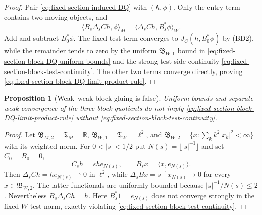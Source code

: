 \documentclass[11pt]{article}
\newtheorem{proposition}[theorem]{Proposition}
\begin{document}
\begin{proof}
Pair \eqref{eq:fixed-section-induced-DQ} with $(h,\phi)$.  Only the entry
term contains two moving objects, and
\[
 \langle B_s\Delta_sCh,\phi\rangle_M
 =\langle\Delta_sCh,B_s^*\phi\rangle_W.
\]
Add and subtract $B_0^*\phi$.  The fixed-test term converges to
$J_C(h,B_0^*\phi)$ by \textup{(BD2)}, while the remainder tends to zero by
the uniform $\mathfrak B_{W,1}$ bound in
\eqref{eq:fixed-section-block-DQ-uniform-bounds} and the strong test-side
continuity \eqref{eq:fixed-section-block-test-continuity}.  The other two
terms converge directly, proving
\eqref{eq:fixed-section-block-DQ-limit-product-rule}.
\end{proof}

\begin{proposition}[Weak--weak block gluing is false]
\label{prop:fixed-section-weak-block-countermodel}
Uniform bounds and separate weak convergence of the three block quotients do
not imply \eqref{eq:fixed-section-block-DQ-limit-product-rule} without
\eqref{eq:fixed-section-block-test-continuity}.
\end{proposition}

\begin{proof}
Let $\mathfrak B_{M,2}=\mathfrak T_M=\mathbb R$,
$\mathfrak B_{W,1}=\mathfrak T_W=\ell^2$, and
$\mathfrak B_{W,2}=\{x:\sum_k k^2|x_k|^2<\infty\}$ with its weighted norm.
For $0<|s|<1/2$ put $N(s)=\lfloor|s|^{-1}\rfloor$ and set
$C_0=B_0=0$,
\[
 C_sh=sh e_{N(s)},
 \qquad B_sx=\langle x,e_{N(s)}\rangle.
\]
Then $\Delta_sCh=he_{N(s)}\rightharpoonup0$ in $\ell^2$, while
$\Delta_sBx=s^{-1}x_{N(s)}\to0$ for every $x\in\mathfrak B_{W,2}$.
The latter functionals are uniformly bounded because
$|s|^{-1}/N(s)\le2$.  Nevertheless
$B_s\Delta_sCh=h$.  Here $B_s^*1=e_{N(s)}$ does not converge strongly
in the fixed $W$-test norm, exactly violating
\eqref{eq:fixed-section-block-test-continuity}.
\end{proof}
\end{document}
